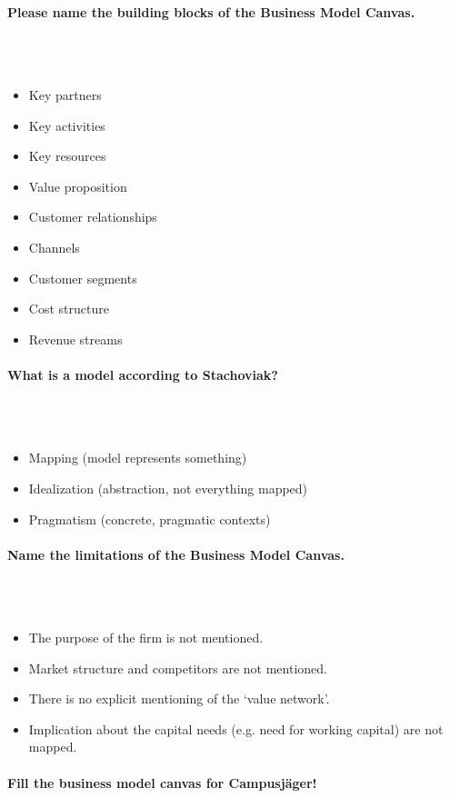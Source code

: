\documentclass[10pt,a4paper,noendnumber=true]{scrartcl}
\newcommand{\properparagraph}[1]{\paragraph{\textcolor{Emerald}{#1}}\mbox{}\\}
\begin{document}
\properparagraph{Please name the building blocks of the Business Model Canvas.}
\\[-6ex]
\begin{itemize}
	\item Key partners
	\item Key activities
	\item Key resources
	\item Value proposition
	\item Customer relationships
	\item Channels
	\item Customer segments
	\item Cost structure
	\item Revenue streams
\end{itemize}


\properparagraph{What is a model according to Stachoviak?}
\\[-6ex]
\begin{itemize}
	\item Mapping (model represents something)
	\item Idealization (abstraction, not everything mapped)
	\item Pragmatism (concrete, pragmatic contexts)
\end{itemize}

\properparagraph{Name the limitations of the Business Model Canvas.}
\\[-6ex]
\begin{itemize}
	\item The purpose of the firm is not mentioned.
	\item Market structure and competitors are not mentioned.
	\item There is no explicit mentioning of the ‘value network’.
	\item Implication about the capital needs (e.g. need for working capital) are not mapped.
\end{itemize}

\properparagraph{Fill the business model canvas for Campusjäger!}
\end{document}
